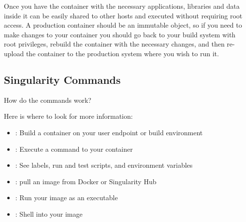 \documentclass[letterpaper,10pt,english]{sphinxmanual}
\begin{document}
Once you have the container with the necessary applications, libraries
and data inside it can be easily shared to other hosts and executed
without requiring root access. A production container should be an
immutable object, so if you need to make changes to your container you
should go back to your build system with root privileges, rebuild the
container with the necessary changes, and then re-upload the container
to the production system where you wish to run it.


\subsection{Singularity Commands}
\label{\detokenize{introduction:singularity-commands}}
How do the commands work?

Here is where to look for more information:
\begin{itemize}
\item {} 
{\hyperref[\detokenize{appendix:build-command}]{}} : Build a container on your user endpoint or build environment

\item {} 
{\hyperref[\detokenize{appendix:exec-command}]{}} : Execute a command to your container

\item {} 
{\hyperref[\detokenize{appendix:inspect-command}]{}} : See labels, run and test scripts, and environment variables

\item {} 
{\hyperref[\detokenize{appendix:pull-command}]{}} : pull an image from Docker or Singularity Hub

\item {} 
{\hyperref[\detokenize{appendix:run-command}]{}} : Run your image as an executable

\item {} 
{\hyperref[\detokenize{appendix:shell-command}]{}} : Shell into your image

\end{itemize}
\end{document}
